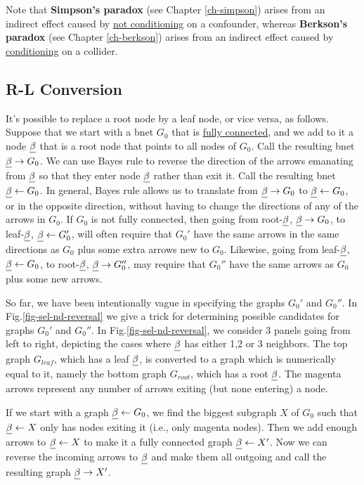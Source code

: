 Note that
{\bf Simpson's paradox} (see Chapter
\ref{ch-simpson}) arises from an indirect effect
caused by \ul{not conditioning}
on a confounder,
whereas
{\bf Berkson's paradox}
(see Chapter \ref{ch-berkson})
arises from an indirect effect
caused by \ul{conditioning}
on a collider.

\subsection{R-L Conversion}

It's possible to replace a root node
by a leaf node, or vice versa, as
follows.
Suppose that we start with
a bnet $G_0$ that is \ul{fully connected}, and
we add to it a node $\rvbeta$
that is a root node that points
to all nodes of $G_0$.
Call the resulting bnet $\rvbeta\rarrow G_0$.
We can use Bayes rule to reverse the direction
of the arrows emanating from $\rvbeta$
so that they enter node $\rvbeta$
rather than exit
it.
Call the resulting bnet $\rvbeta\larrow G_0$.
In general,
Bayes rule allows us to translate
from $\rvbeta\rarrow G_0$ to
$\rvbeta\larrow G_0$,
or in the opposite direction,
without having to change the
directions of any of the arrows in $G_0$.
If $G_0$ is not fully connected, then
going from root-$\rvbeta$,
$\rvbeta\rarrow G_0$, to leaf-$\rvbeta$,
$\rvbeta\larrow G_0'$,
will often require that $G_0'$
have the same arrows in the same
directions as $G_0$
plus some extra arrows
new to $G_0$.
Likewise, going
from leaf-$\rvbeta$, $\rvbeta\larrow G_0$, to root-$\rvbeta$,
$\rvbeta\rarrow G_0''$,
may require that $G_0''$ have
the same arrows as $G_0$ plus some new arrows.

So far, we have
been intentionally
vague in specifying the graphs
$G_0'$ and $G_0''$.
In Fig.\ref{fig-sel-nd-reversal}
we give a trick for determining
possible candidates for
graphs $G_0'$ and $G_0''$.
In
Fig.\ref{fig-sel-nd-reversal},
we consider 3 panels going from left
to right, depicting
the cases where $\rvbeta$ has either 1,2 or 3 neighbors.
The top graph
 $G_{leaf}$, which has
a leaf $\rvbeta$, is converted
to a graph which is numerically
equal to it, namely
the bottom
graph
 $G_{root}$, which has
a root $\rvbeta$.
The magenta arrows represent
any number of arrows
exiting (but none entering)
a node.

If we start
with a graph $\rvbeta\larrow G_0$,
we find the biggest subgraph $X$ of
$G_0$ such
that $\rvbeta\larrow X$ only has nodes
exiting it (i.e., only magenta nodes).
Then we add enough
arrows to $\rvbeta\larrow X$
to make it a fully connected graph
$\rvbeta\larrow X'$.
Now we can reverse the incoming
arrows to $\rvbeta$ and make them
all outgoing and call the
resulting graph $\rvbeta\rarrow X'$.

